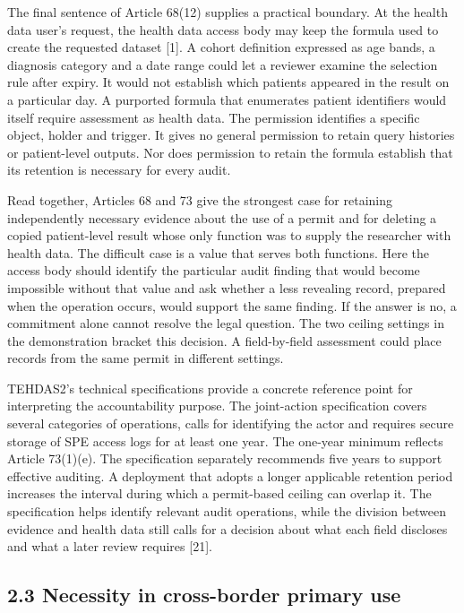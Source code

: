 \documentclass[5p,twocolumn]{elsarticle}
\begin{document}
The final sentence of Article 68(12) supplies a practical boundary. At
the health data user's request, the health data access body may keep the
formula used to create the requested dataset {[}1{]}. A cohort
definition expressed as age bands, a diagnosis category and a date range
could let a reviewer examine the selection rule after expiry. It would
not establish which patients appeared in the result on a particular day.
A purported formula that enumerates patient identifiers would itself
require assessment as health data. The permission identifies a specific
object, holder and trigger. It gives no general permission to retain
query histories or patient-level outputs. Nor does permission to retain
the formula establish that its retention is necessary for every audit.

Read together, Articles 68 and 73 give the strongest case for retaining
independently necessary evidence about the use of a permit and for
deleting a copied patient-level result whose only function was to supply
the researcher with health data. The difficult case is a value that
serves both functions. Here the access body should identify the
particular audit finding that would become impossible without that value
and ask whether a less revealing record, prepared when the operation
occurs, would support the same finding. If the answer is no, a
commitment alone cannot resolve the legal question. The two ceiling
settings in the demonstration bracket this decision. A field-by-field
assessment could place records from the same permit in different
settings.

TEHDAS2's technical specifications provide a concrete reference point
for interpreting the accountability purpose. The joint-action
specification covers several categories of operations, calls for
identifying the actor and requires secure storage of SPE access logs for
at least one year. The one-year minimum reflects Article 73(1)(e). The
specification separately recommends five years to support effective
auditing. A deployment that adopts a longer applicable retention period
increases the interval during which a permit-based ceiling can overlap
it. The specification helps identify relevant audit operations, while
the division between evidence and health data still calls for a decision
about what each field discloses and what a later review requires
{[}21{]}.

\hypertarget{necessity-in-cross-border-primary-use}{%
\subsection{2.3 Necessity in cross-border primary
use}\label{necessity-in-cross-border-primary-use}}
\end{document}
